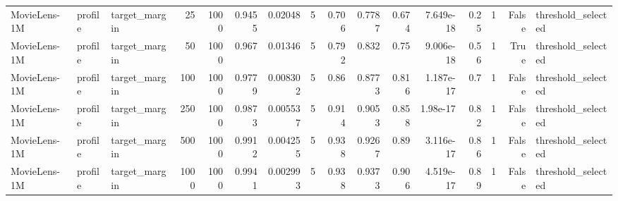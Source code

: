 \begin{table}[t]
{\begin{tabular}{lllrrrrrrrrrrrrl}
MovieLens-1M & profile & target\_margin & 25 & 1000 & 0.9455 & 0.02048 & 5 & 0.706 & 0.7787 & 0.674 & 7.649e-18 & 0.25 & 1 & False & threshold\_selected \\
MovieLens-1M & profile & target\_margin & 50 & 1000 & 0.967 & 0.01346 & 5 & 0.792 & 0.832 & 0.75 & 9.006e-18 & 0.56 & 1 & True & threshold\_selected \\
MovieLens-1M & profile & target\_margin & 100 & 1000 & 0.9779 & 0.008302 & 5 & 0.86 & 0.8773 & 0.816 & 1.187e-17 & 0.7 & 1 & False & threshold\_selected \\
MovieLens-1M & profile & target\_margin & 250 & 1000 & 0.9873 & 0.005537 & 5 & 0.914 & 0.9053 & 0.858 & 1.98e-17 & 0.82 & 1 & False & threshold\_selected \\
MovieLens-1M & profile & target\_margin & 500 & 1000 & 0.9912 & 0.004255 & 5 & 0.938 & 0.9267 & 0.89 & 3.116e-17 & 0.86 & 1 & False & threshold\_selected \\
MovieLens-1M & profile & target\_margin & 1000 & 1000 & 0.9941 & 0.002993 & 5 & 0.938 & 0.9373 & 0.906 & 4.519e-17 & 0.89 & 1 & False & threshold\_selected \\
\bottomrule
\end{tabular}
}
\end{table}
